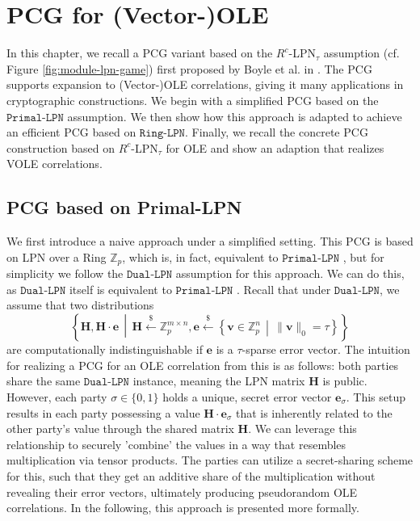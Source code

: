 \chapter{PCG for (Vector-)OLE}
\label{chapter:PCGforVOLE}
In this chapter, we recall a PCG variant based on the $R^{c}$-LPN$_{\tau}$ assumption (cf. Figure \ref{fig:module-lpn-game}) first proposed by Boyle et al. in \cite{boyle2020efficient}. The PCG supports expansion to (Vector-)OLE correlations, giving it many applications in cryptographic constructions. We begin with a simplified PCG based on the $\texttt{Primal-LPN}$ assumption. We then show how this approach is adapted to achieve an efficient PCG based on $\texttt{Ring-LPN}$. Finally, we recall the concrete PCG construction based on $R^{c}$-LPN$_{\tau}$ for OLE \cite{boyle2020efficient} and show an adaption that realizes VOLE correlations.

\section{PCG based on Primal-LPN}
\label{sec:naivePCG}
We first introduce a naive approach under a simplified setting. This PCG is based on LPN over a Ring $\mathbb{Z}_p$, which is, in fact, equivalent to $\texttt{Primal-LPN}$ \cite{blum1993cryptographic}, but for simplicity we follow the $\texttt{Dual-LPN}$ assumption for this approach. We can do this, as $\texttt{Dual-LPN}$ itself is equivalent to $\texttt{Primal-LPN}$ \cite{couteau2021silver}. Recall that under $\texttt{Dual-LPN}$, we assume that two distributions
$$
\left\{ \mathbf{H}, \mathbf{H} \cdot \mathbf{e} \,\middle|\, \mathbf{H} \stackrel{\$}{\leftarrow} \mathbb{Z}_p^{m \times n}, \mathbf{e} \stackrel{\$}{\leftarrow} \left\{ \mathbf{v} \in \mathbb{Z}_p^n \,\middle|\, \|\mathbf{v}\|_0 = \tau \right\} \right\}
$$
are computationally indistinguishable if $\mathbf{e}$ is a $\tau$-sparse error vector. The intuition for realizing a PCG for an OLE correlation from this is as follows: both parties share the same $\texttt{Dual-LPN}$ instance, meaning the LPN matrix $\mathbf{H}$ is public. However, each party $\sigma \in\{0,1\}$ holds a unique, secret error vector $\mathbf{e}_\sigma$. This setup results in each party possessing a value $\mathbf{H}\cdot \mathbf{e}_\sigma$ that is inherently related to the other party's value through the shared matrix $\mathbf{H}$. We can leverage this relationship to securely ’combine’ the values in a way that resembles multiplication via tensor products. The parties can utilize a secret-sharing scheme for this, such that they get an additive share of the multiplication without revealing their error vectors, ultimately producing pseudorandom OLE correlations. In the following, this approach is presented more formally.

